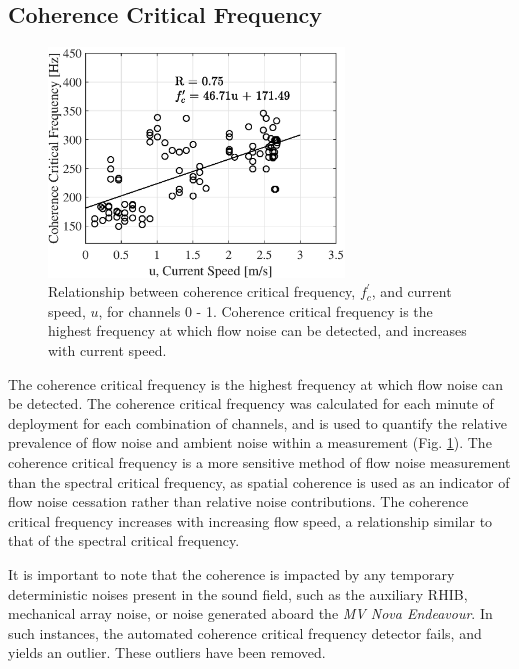 \documentclass[12pt,journal,onecolumn]{IEEEtran}
\begin{document}
\subsection{Coherence Critical Frequency}
\begin{figure}[!t]
	\begin{center}
		\includegraphics[width=0.7\textwidth]{figure6.eps} %
	\end{center}%
	\caption[Spatial coherence thresholding results.]{
	\label{f:c_thresh}
	Relationship between coherence critical frequency, $f^\prime_c$, and current speed, $u$, for channels 0 - 1. Coherence critical frequency is the highest frequency at which flow noise can be detected, and increases with current speed. }%
\end{figure}
The coherence critical frequency is the highest frequency at which flow noise can be detected. The coherence critical frequency was calculated for each minute of deployment for each combination of channels, and is used to quantify the relative prevalence of flow noise and ambient noise within a measurement (Fig. \ref{f:c_thresh}). The coherence critical frequency is a more sensitive method of flow noise measurement than the spectral critical frequency, as spatial coherence is used as an indicator of flow noise cessation rather than relative noise contributions. The coherence critical frequency increases with increasing flow speed, a relationship similar to that of the spectral critical frequency. 

It is important to note that the coherence is impacted by any temporary deterministic noises present in the sound field, such as the auxiliary RHIB, mechanical array noise, or noise generated aboard the \emph{MV Nova Endeavour}. In such instances, the automated coherence critical frequency detector fails, and yields an outlier. These outliers have been removed.%
\end{document}

